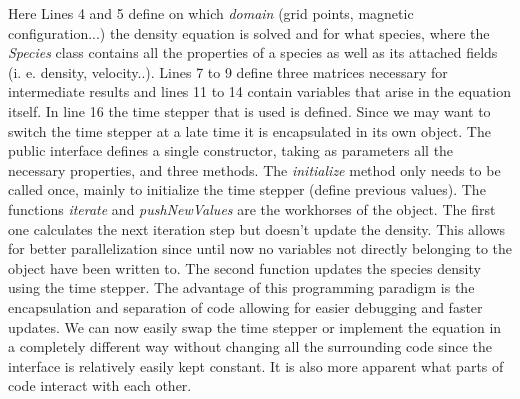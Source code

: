 Here Lines 4 and 5 define on which \textit{domain} (grid points, magnetic configuration...) the density equation is solved and for what species, where the \textit{Species} class contains all the properties of a species as well as its attached fields (i. e. density, velocity..).\newline
Lines 7 to 9 define three matrices necessary for intermediate results and lines 11 to 14 contain variables that arise in the equation itself.  In line 16 the time stepper that is used is defined. Since we may want to switch the time stepper at a late time it is encapsulated in its own object.\newline
The public interface defines a single constructor, taking as parameters all the necessary properties, and three methods. The \textit{initialize} method only needs to be called once, mainly to initialize the time stepper (define previous values).
The functions \textit{iterate} and \textit{pushNewValues} are the workhorses of the object. The first one calculates the next iteration step but doesn't update the density. This allows for better parallelization since until now no variables not directly belonging to the object have been written to. The second function updates the species density using the time stepper.\newline
The advantage of this programming paradigm is the encapsulation and separation of code allowing for easier debugging and faster updates. We can now easily swap the time stepper or implement the equation in a completely different way without changing all the surrounding code since the interface is relatively easily kept constant. It is also more apparent what parts of code interact with each other.

